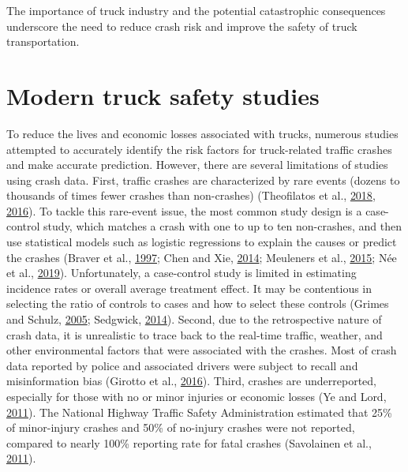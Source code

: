 \documentclass[12pt]{book}
\numberwithin{equation}{chapter}
\begin{document}
The importance of truck industry and the potential catastrophic consequences underscore the need to reduce crash risk and improve the safety of truck transportation.

\hypertarget{modern-truck-safety-studies}{%
\section{Modern truck safety studies}\label{modern-truck-safety-studies}}

To reduce the lives and economic losses associated with trucks, numerous studies attempted to accurately identify the risk factors for truck-related traffic crashes and make accurate prediction. However, there are several limitations of studies using crash data. First, traffic crashes are characterized by rare events (dozens to thousands of times fewer crashes than non-crashes) (Theofilatos et al., \protect\hyperlink{ref-theofilatos2018impact}{2018}, \protect\hyperlink{ref-theofilatos2016predicting}{2016}). To tackle this rare-event issue, the most common study design is a case-control study, which matches a crash with one to up to ten non-crashes, and then use statistical models such as logistic regressions to explain the causes or predict the crashes (Braver et al., \protect\hyperlink{ref-braver1997tractor}{1997}; Chen and Xie, \protect\hyperlink{ref-chen2014modeling}{2014}; Meuleners et al., \protect\hyperlink{ref-meuleners2015obstructive}{2015}; Née et al., \protect\hyperlink{ref-nee2019road}{2019}). Unfortunately, a case-control study is limited in estimating incidence rates or overall average treatment effect. It may be contentious in selecting the ratio of controls to cases and how to select these controls (Grimes and Schulz, \protect\hyperlink{ref-grimes2005compared}{2005}; Sedgwick, \protect\hyperlink{ref-sedgwick2014case}{2014}). Second, due to the retrospective nature of crash data, it is unrealistic to trace back to the real-time traffic, weather, and other environmental factors that were associated with the crashes. Most of crash data reported by police and associated drivers were subject to recall and misinformation bias (Girotto et al., \protect\hyperlink{ref-girotto2016professional}{2016}). Third, crashes are underreported, especially for those with no or minor injuries or economic losses (Ye and Lord, \protect\hyperlink{ref-ye2011investigation}{2011}). The National Highway Traffic Safety Administration estimated that 25\% of minor-injury crashes and 50\% of no-injury crashes were not reported, compared to nearly 100\% reporting rate for fatal crashes (Savolainen et al., \protect\hyperlink{ref-savolainen2011statistical}{2011}).
\end{document}
